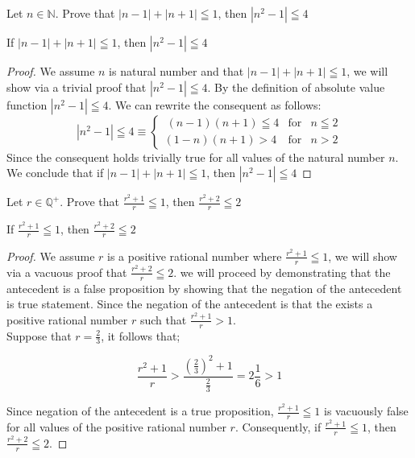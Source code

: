 \begin{example}
Let $n \in \mathbb{N}$. Prove that $|n-1|+|n+1| \leqq 1$, then $|n^2-1| \leqq 4$

\begin{tcolorbox}
	\begin{theorem}
		If $|n-1|+|n+1| \leqq 1$, then $|n^2-1| \leqq 4$
	\end{theorem}
\end{tcolorbox}

\begin{proof}
We assume $n$ is natural number and that $|n-1|+|n+1| \leqq 1$, we will show via a trivial proof that $|n^2-1| \leqq 4$. By the definition of absolute value function $|n^2-1| \leqq 4$. We can rewrite the consequent as follows: 
	\begin{equation}
		|n^2-1| \leqq 4 \equiv \left\{ 
			\begin{array}{rcl}\
				(n-1)(n+1)\leqq 4 & \mbox{for} & n \leqq 2 \\ 
				(1-n)(n+1) > 4 & \mbox{for} & n > 2 
			\end{array} \right.  \nonumber 
	\end{equation}
Since the consequent holds trivially true for all values of the natural number $n$. We conclude that if $|n-1|+|n+1| \leqq 1$, then $|n^2-1| \leqq 4$

\end{proof}
\end{example}


\begin{example}
Let $r \in \mathbb{Q}^+$. Prove that $\frac{r^2 + 1}{r} \leqq 1$, then $\frac{r^2 + 2}{r} \leqq 2$

\begin{tcolorbox}
	\begin{theorem}
		If $\frac{r^2 + 1}{r} \leqq 1$, then $\frac{r^2 + 2}{r} \leqq 2$
	\end{theorem}
\end{tcolorbox}

\begin{proof}
We assume $r$ is a positive rational number where $\frac{r^2 + 1}{r} \leqq 1$, we will show via a vacuous proof that $\frac{r^2 + 2}{r} \leqq 2$. we will proceed by demonstrating that the antecedent is a false proposition by showing that the negation of the antecedent is true statement. Since the negation of the antecedent is that the exists a positive rational number $r$ such that $\frac{r^2 + 1}{r} > 1$. \\ 
Suppose that $r = \frac{2}{3}$, it follows that; 

	\begin{equation}
		\frac{r^2 + 1}{r}>\frac{(\frac{2}{3})^2+1}{\frac{2}{3}} = 2\frac{1}{6}>1 \nonumber 
	\end{equation}

Since negation of the antecedent is a true proposition, $\frac{r^2 + 1}{r} \leqq 1$ is vacuously false for all values of the positive rational number $r$. Consequently, if $\frac{r^2 + 1}{r} \leqq 1$, then $\frac{r^2 + 2}{r} \leqq 2$.
\end{proof}
\end{example}



